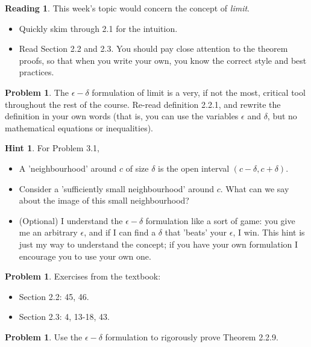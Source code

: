 \documentclass[letterpaper, 12pt]{article}
\theoremstyle{plain}
\theoremstyle{definition}
\newtheorem{problem}[theorem]{Problem}
\newtheorem*{reading}{Reading}
\newtheorem*{hint}{Hint}
\begin{document}
\begin{reading} This week's topic would concern the concept of {\it limit}.
    \begin{itemize}
        \item Quickly skim through 2.1 for the intuition.
        \item Read Section 2.2 and 2.3. You should pay close attention to the theorem proofs, so that when you write your own, you know the correct style and best practices.
    \end{itemize}
\end{reading}

\begin{problem}
    The $\epsilon-\delta$ formulation of limit is a very, if not the most, critical tool throughout the rest of the course. Re-read definition 2.2.1, and rewrite the definition in your own words (that is, you can use the variables $\epsilon$ and $\delta$, but no mathematical equations or inequalities).
\end{problem}

\begin{hint} For Problem 3.1,
    \begin{itemize}
        \item A 'neighbourhood' around $c$ of size $\delta$ is the open interval $(c-\delta, c+\delta)$.
        \item Consider a 'sufficiently small neighbourhood' around $c$. What can we say about the image of this small neighbourhood?
        \item (Optional) I understand the $\epsilon-\delta$ formulation like a sort of game: you give me an arbitrary $\epsilon$, and if I can find a $\delta$ that 'beats' your $\epsilon$, I win. This hint is just my way to understand the concept; if you have your own formulation I encourage you to use your own one.
    \end{itemize}
\end{hint}

\begin{problem}
    Exercises from the textbook:
    \begin{itemize}
        \item Section 2.2: 45, 46.
        \item Section 2.3: 4, 13-18, 43.
    \end{itemize}
\end{problem}

\begin{problem}
    Use the $\epsilon-\delta$ formulation to rigorously prove Theorem 2.2.9.
\end{problem}
\end{document}
